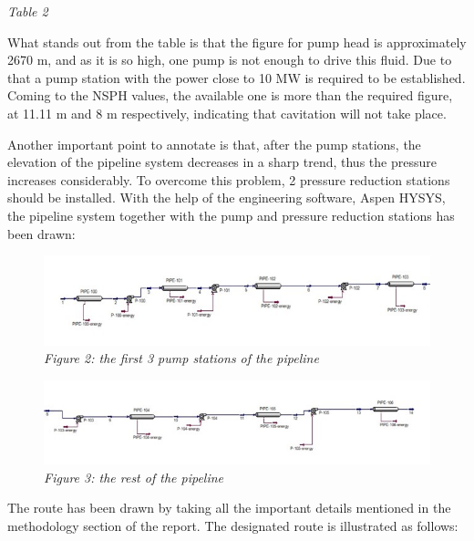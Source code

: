 \documentclass[12pt]{article}
\begin{document}
\vspace{2mm}
\textit{Table 2}
\vspace{3mm}

{\fontsize{12pt}{12pt}

\hspace*{1em} What stands out from the table is that the figure for pump head is approximately 2670 m, and as it is so high, one pump is not enough to drive this fluid. Due to that a pump station with the power close to 10 MW is required to be established. Coming to the NSPH values, the available one is more than the required figure, at 11.11 m and 8 m respectively, indicating that cavitation will not take place. 

Another important point to annotate is that, after the pump stations, the elevation of the pipeline system decreases in a sharp trend, thus the pressure increases considerably. To overcome this problem, 2 pressure reduction stations should be installed. With the help of the engineering software, Aspen HYSYS, the pipeline system together with the pump and pressure reduction stations has been drawn: \\

\begin{figure}[H]
  \centering
  \includegraphics[width=1\textwidth]{assets/images/design1.jpg}
  \textit{Figure 2: the first 3 pump stations of the pipeline}
  
 \end{figure}

 \begin{figure}[H]
  \centering
  \includegraphics[width=1\textwidth]{assets/images/design2.jpg}
  \textit{Figure 3: the rest of the pipeline}
  
 \end{figure}
 {\fontsize{12pt}{12pt}

 The route has been drawn by taking all the important details mentioned in the methodology section of the report. The designated route is illustrated as follows: \\
 }

}
\end{document}
